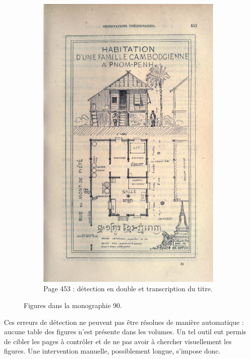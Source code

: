 \begin{figure}
\begin{subfigure}{0.4\textwidth}
     \includegraphics[width=1\linewidth]{img/odm90_453.jpg}
     \caption{Page 453 : détection en double et transcription du titre.}
     \label{fig:odmfig90453}
    \end{subfigure}
    \caption{Figures dans la monographie \no{} 90.}
    \label{fig:odmfig90}
\end{figure}

Ces erreurs de détection ne peuvent pas être résolues de manière automatique : aucune table des figures n'est présente dans les volumes. Un tel outil eut permis de cibler les pages à contrôler et de ne pas avoir à chercher visuellement les figures. Une intervention manuelle, possiblement longue, s'impose donc.

